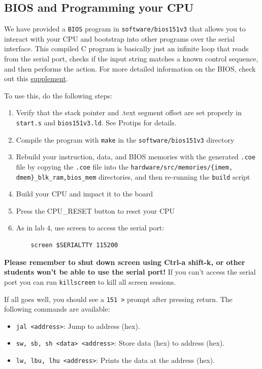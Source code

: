 \documentclass[11pt]{article}
\begin{document}
\subsection{BIOS and Programming your CPU}
\label{bios_info}

We have provided a \verb|BIOS| program in \verb|software/bios151v3| that allows you to interact with your CPU and bootstrap into other programs over the serial interface. This compiled C program is basically just an infinite loop that reads from the serial port, checks if the input string matches a known control sequence, and then performs the action. For more detailed information on the BIOS, check out this \href{http://www-inst.eecs.berkeley.edu/~cs150/fa12/project/BIOSInfo.pdf}{supplement}.

To use this, do the following steps:
\begin{enumerate}
	\item Verify that the stack pointer and .text segment offset are set properly in \verb|start.s| and \verb|bios151v3.ld|. See Protips for details.
	\item Compile the program with \verb|make| in the \verb|software/bios151v3| directory
	\item Rebuild your instruction, data, and BIOS memories with the generated \verb|.coe| file by copying the \verb|.coe| file into the \verb|hardware/src/memories/{imem, dmem}_blk_ram,bios_mem| directories, and then re-running the \verb|build| script
	\item Build your CPU and impact it to the board
	\item Press the CPU\_RESET button to reset your CPU
	\item As in lab 4, use screen to access the serial port:
	\begin{verbatim}
	screen $SERIALTTY 115200
	\end{verbatim}
\end{enumerate}

\textbf{Please remember to shut down screen using Ctrl-a shift-k, or other students won't be able to use the serial port!} If you can't access the serial port you can run \verb|killscreen| to kill all screen sessions. 

If all goes well, you should see a \verb|151 >| prompt after pressing return. The following commands are available:
\begin{itemize}
    \item \verb|jal <address>|: Jump to address (hex).
    \item \verb|sw, sb, sh <data> <address>|: Store data (hex) to address (hex).
    \item \verb|lw, lbu, lhu <address>|: Prints the data at the address (hex).
\end{itemize}
\end{document}
